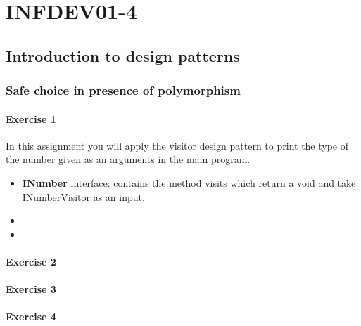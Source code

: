 \setcounter{part}{4}
\part{INFDEV01-4}
\setcounter{chapter}{1}
\chapter{Introduction to design patterns}

\section{Safe choice in presence of polymorphism }
    
\subsection{Exercise 1} In this assignment you will apply the visitor design pattern to print the type of the number given as an arguments in the main program.  
\begin{itemize}
\item \textbf{INumber} interface: contains the method visits which return a void and take INumberVisitor as an input. 
\item
\item
\end{itemize}  
\subsection{Exercise 2} 
\subsection{Exercise 3} 
\subsection{Exercise 4} 